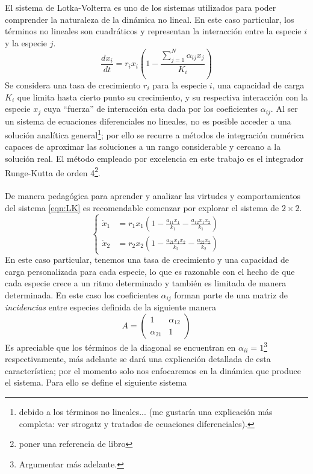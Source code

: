\documentclass[11pt,a4paper]{article}
\begin{document}
El sistema de Lotka-Volterra es uno de los sistemas utilizados para poder comprender la naturaleza de la dinámica no lineal. En este caso particular, los términos no lineales son cuadráticos y representan la interacción entre la especie $i$ y la especie $j$. 
\begin{equation}\label{eqn:LK}
	\frac{dx_i}{dt}=r_ix_i\left(1-\frac{\sum_{j=1}^N \alpha_{ij}x_j}{K_i}\right)
\end{equation}
Se considera una tasa de crecimiento $r_i$ para la especie $i$, una capacidad de carga $K_i$ que limita hasta cierto punto su crecimiento, y su respectiva interacción con la especie $x_j$ cuya ``fuerza'' de interacción esta dada por los coeficientes $\alpha_{ij}$. Al ser un sistema de ecuaciones diferenciales no lineales, no es posible acceder a una solución analítica general\footnote{debido a los términos no lineales... (me gustaría una explicación más completa: ver strogatz y tratados de ecuaciones diferenciales).}; por ello se recurre a métodos de integración numérica capaces de aproximar las soluciones a un rango considerable y cercano a la solución real. El método empleado por excelencia en este trabajo es el integrador Runge-Kutta de orden 4\footnote{poner una referencia de libro}.\\
\\
De manera pedagógica para aprender y analizar las virtudes y comportamientos del sistema \ref{eqn:LK} es recomendable comenzar por explorar el sistema de $2\times 2$.
$$
\begin{cases}
	\dot{x}_1&=r_1x_1(1-\frac{a_{11}x_1}{k_1}-\frac{a_{12}x_1x_2}{k_1})\\
	\dot{x}_2&=r_2x_2(1-\frac{a_{21}x_1x_2}{k_2}-\frac{a_{22}x_2}{k_2})
\end{cases}
$$
En este caso particular, tenemos una tasa de crecimiento y una capacidad de carga personalizada para cada especie, lo que es razonable con el hecho de que cada especie crece a un ritmo determinado y también es limitada de manera determinada. En este caso los coeficientes $\alpha_{ij}$ forman parte de una matriz de \textit{incidencias} entre especies definida de la siguiente manera
$$A=
\begin{pmatrix}
	1 & \alpha_{12}\\
	\alpha_{21} &1
\end{pmatrix}
$$
Es apreciable que los términos de la diagonal se encuentran en $\alpha_{ii} = 1$\footnote{Argumentar más adelante.} respectivamente, más adelante se dará una explicación detallada de esta característica; por el momento solo nos enfocaremos en la dinámica que produce el sistema. Para ello se define el siguiente sistema
\end{document}
